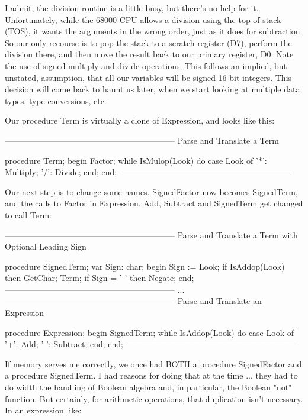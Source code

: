 \documentclass[float=false, crop=false]{standalone}
\begin{document}
I admit, the division routine is a little busy, but there's no help for it.
Unfortunately, while the 68000 CPU allows a division using the top of stack
(TOS), it wants the arguments in the wrong order, just as it does for
subtraction. So our only recourse is to pop the stack to a scratch register
(D7), perform the division there, and then move the result back to our primary
register, D0. Note the use of signed multiply and divide operations. This
follows an implied, but unstated, assumption, that all our variables will be
signed 16-bit integers. This decision will come back to haunt us later, when we
start looking at multiple data types, type conversions, etc.

Our procedure Term is virtually a clone of Expression, and looks like this:

\begin{code}
{--------------------------------------------------------------}
{ Parse and Translate a Term }

procedure Term;
begin
	Factor;
	while IsMulop(Look) do
		case Look of
			'*': Multiply;
			'/': Divide;
		end;
end;
{--------------------------------------------------------------}
\end{code}

Our next step is to change some names. SignedFactor now becomes SignedTerm, and
the calls to Factor in Expression, Add, Subtract and SignedTerm get changed to
call Term:

\begin{code}
{--------------------------------------------------------------}
{ Parse and Translate a Term with Optional Leading Sign }

procedure SignedTerm;
var Sign: char;
begin
	Sign := Look;
	if IsAddop(Look) then
		GetChar;
	Term;
	if Sign = '-' then Negate;
end;
{--------------------------------------------------------------}
...
{--------------------------------------------------------------}
{ Parse and Translate an Expression }

procedure Expression;
begin
	SignedTerm;
	while IsAddop(Look) do
		case Look of
			'+': Add;
			'-': Subtract;
		end;
end;
{--------------------------------------------------------------}
\end{code}

If memory serves me correctly, we once had BOTH a procedure SignedFactor and a
procedure SignedTerm. I had reasons for doing that at the time ... they had to
do width the handling of Boolean algebra and, in particular, the Boolean "not"
function. But certainly, for arithmetic operations, that duplication isn't
necessary. In an expression like:
\end{document}
